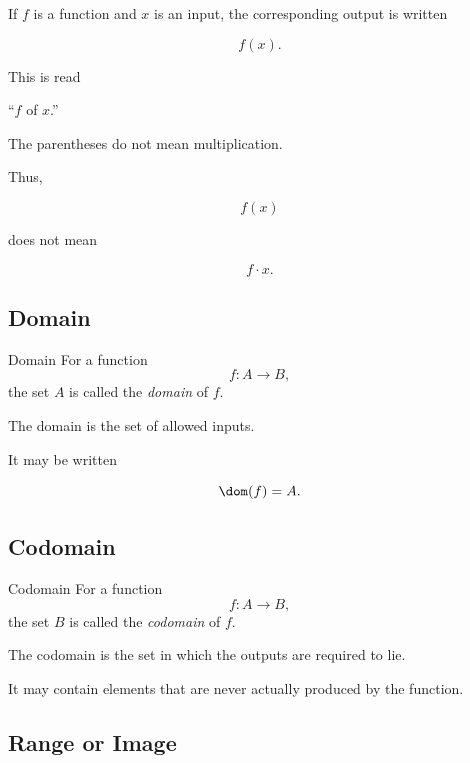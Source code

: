 If \(f\) is a function and \(x\) is an input, the corresponding output is
written

\[ f(x). \]

This is read

\begin{center}
``\(f\) of \(x\).''
\end{center}

The parentheses do not mean multiplication.

Thus,

\[ f(x) \]

does not mean

\[ f\cdot x. \]

\subsection{Domain}
\label{subsec:function-domain}

\begin{definitionbox}{Domain}
For a function
\[ f:A\to B, \]
the set \(A\) is called the \emph{domain} of \(f\).
\end{definitionbox}

The domain is the set of allowed inputs.

It may be written

\[ \dom(f)=A. \]

\subsection{Codomain}
\label{subsec:function-codomain}

\begin{definitionbox}{Codomain}
For a function
\[ f:A\to B, \]
the set \(B\) is called the \emph{codomain} of \(f\).
\end{definitionbox}

The codomain is the set in which the outputs are required to lie.

It may contain elements that are never actually produced by the function.

\subsection{Range or Image}
\label{subsec:function-range}

